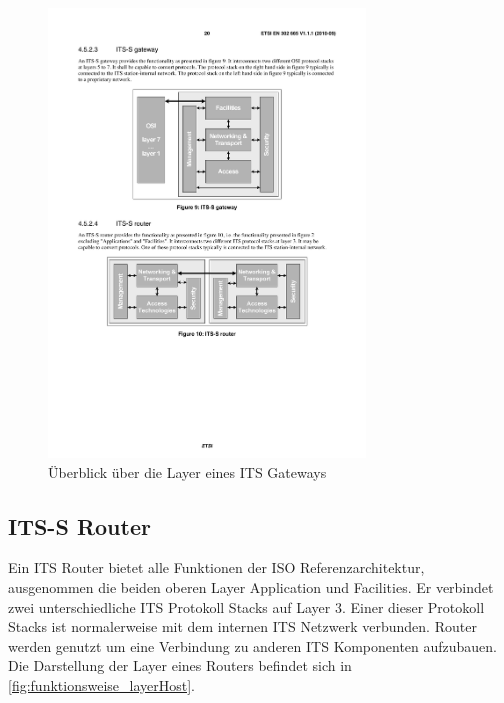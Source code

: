 \begin{figure}[h]
	\includegraphics[width=0.75\textwidth]{content/images/01_funktionsweise/layer_gateway.pdf}
	\caption{Überblick über die Layer eines ITS Gateways \cite{en302665}}
	\label{fig:funktionsweise_itsGateway}
\end{figure}


\subsection{ITS-S Router \label{funktionsweise_router}}
Ein \ac{ITS} Router bietet alle Funktionen der \ac{ISO} Referenzarchitektur, ausgenommen die beiden oberen Layer Application und Facilities. Er verbindet zwei unterschiedliche \ac{ITS} Protokoll Stacks auf Layer 3. Einer dieser Protokoll Stacks ist normalerweise mit dem internen \ac{ITS} Netzwerk verbunden. Router werden genutzt um eine Verbindung zu anderen \ac{ITS} Komponenten aufzubauen. Die Darstellung der Layer eines Routers befindet sich in  \autoref{fig:funktionsweise_layerHost}.

